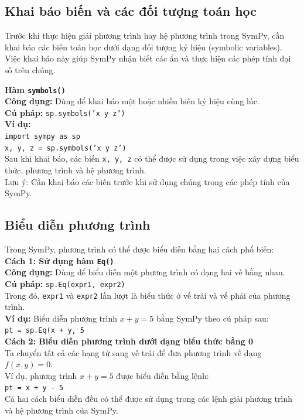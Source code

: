 \documentclass[13pt,a4paper]{article}
\begin{document}
\subsection{Khai báo biến và các đối tượng toán học}
Trước khi thực hiện giải phương trình hay hệ phương trình trong SymPy, cần khai báo các biến toán học dưới dạng đối tượng ký hiệu (symbolic variables). Việc khai báo này giúp SymPy nhận biết các ẩn và thực hiện các phép tính đại số trên chúng.

\noindent\textbf{Hàm \texttt{symbols()}}\\
\textbf{Công dụng: }Dùng để khai báo một hoặc nhiều biến ký hiệu cùng lúc.\\
\textbf{Cú pháp:} \texttt{sp.symbols('x y z')}\\
\textbf{Ví dụ:}\\
\texttt{import sympy as sp\\
x, y, z = sp.symbols('x y z')}\\
Sau khi khai báo, các biến \texttt{x, y, z} có thể được sử dụng trong việc xây dựng biểu thức, phương trình và hệ phương trình.\\
Lưu ý: Cần khai báo các biến trước khi sử dụng chúng trong các phép tính của SymPy.
\subsection{Biểu diễn phương trình}
Trong SymPy, phương trình có thể được biểu diễn bằng hai cách phổ biến:\\
\textbf{Cách 1: Sử dụng hàm \texttt{Eq()}}\\
\textbf{Công dụng:} Dùng để biểu diễn một phương trình có dạng hai vế bằng nhau.\\
\textbf{Cú pháp:} \texttt{sp.Eq(expr1, expr2)}\\
Trong đó, \texttt{expr1} và \texttt{expr2} lần lượt là biểu thức ở vế trái và vế phải của phương trình.\\
\textbf{Ví dụ:} Biểu diễn phương trình $x+y=5$ bằng SymPy theo cú pháp sau:\\
\texttt{pt = sp.Eq(x + y, 5}\\
\textbf{Cách 2: Biểu diễn phương trình dưới dạng biểu thức bằng 0}\\
Ta chuyển tất cả các hạng tử sang vế trái để đưa phương trình về dạng $f(x,y)=0$.\\
Ví dụ, phương trình $x+y=5$ được biểu diễn bằng lệnh:\\
\texttt{pt = x + y - 5}\\
Cả hai cách biểu diễn đều có thể được sử dụng trong các lệnh giải phương trình và hệ phương trình của SymPy.
\end{document}

